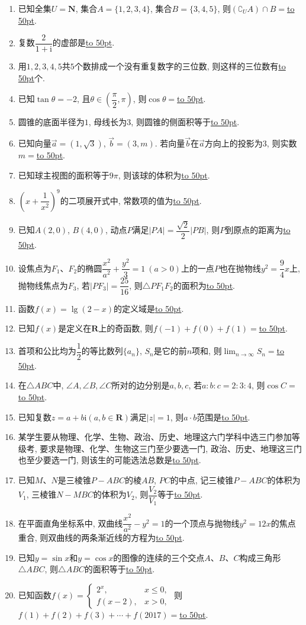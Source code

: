 \documentclass[10pt,a4paper]{article}
\newcommand{\blank}[1]{\underline{\hbox to #1pt{}}}
\begin{document}
\begin{enumerate}[1.]

\item 已知全集$U=\mathbf{N}$, 集合$A=\{1,2,3,4\}$, 集合$B=\{3,4,5\}$, 则$(\complement_U A)\cap B=$\blank{50}.
\item 复数$\dfrac2{1+\mathrm{i}}$的虚部是\blank{50}.
\item 用$1,2,3,4,5$共$5$个数排成一个没有重复数字的三位数, 则这样的三位数有\blank{50}个.
\item 已知$\tan \theta =-2$, 且$\theta \in (\dfrac\pi 2,\pi)$, 则$\cos\theta=$\blank{50}.
\item 圆锥的底面半径为$1$, 母线长为$3$, 则圆锥的侧面积等于\blank{50}.
\item 已知向量$\overrightarrow{a}=(1,\sqrt{3})$, $\overrightarrow{b}=(3,m)$. 若向量$\overrightarrow{b}$在$\overrightarrow{a}$方向上的投影为$3$, 则实数$m=$\blank{50}.
\item 已知球主视图的面积等于$9\pi$, 则该球的体积为\blank{50}.
\item $(x+\dfrac{1}{x^2})^9$的二项展开式中, 常数项的值为\blank{50}.
\item 已知$A(2,0)$, $B(4,0)$, 动点$P$满足$|PA|=\dfrac{\sqrt2} 2|PB|$, 则$P$到原点的距离为\blank{50}.
\item 设焦点为$F_1$、$F_2$的椭圆$\dfrac{x^2}{a^2}+\dfrac{y^2}3=1 \ (a>0)$上的一点$P$也在抛物线$y^2=\dfrac94x$上, 抛物线焦点为$F_3$, 若$|PF_3|=\dfrac{25}{16}$, 则$\triangle PF_1F_2$的面积为\blank{50}.


\item 函数$f(x)=\lg(2-x)$的定义域是\blank{50}.
\item 已知$f(x)$是定义在$\mathbf{R}$上的奇函数, 则$f(-1)+f(0)+f(1)=$\blank{50}.
\item 首项和公比均为$\dfrac12$的等比数列$\{a_n\}$, $S_n$是它的前$n$项和, 则$\displaystyle\lim_{n\to\infty}S_n=$\blank{50}.
\item 在$\triangle ABC$中, $\angle A,\angle B,\angle C$所对的边分别是$a,b,c$, 若$a:b:c=2:3:4 $, 则$\cos C=$\blank{50}.  
\item 已知复数$z=a+b\mathrm{i}(a,b\in \mathbf{R})$满足$|z|=1$, 则$a\cdot b$范围是\blank{50}.  
\item 某学生要从物理、化学、生物、政治、历史、地理这六门学科中选三门参加等级考, 要求是物理、化学、生物这三门至少要选一门, 政治、历史、地理这三门也至少要选一门, 则该生的可能选法总数是\blank{50}.
\item 已知$M$、$N$是三棱锥$P-ABC$的棱$AB$, $PC$的中点, 记三棱锥$P-ABC$的体积为$V_1$, 三棱锥$N-MBC$的体积为$V_2$, 则$\dfrac{V_2}{V_1}$等于\blank{50}.
\item 在平面直角坐标系中, 双曲线$\dfrac{x^2}{a^2}-y^2=1 $的一个顶点与抛物线$y^2=12x$的焦点重合, 则双曲线的两条渐近线的方程为\blank{50}.
\item 已知$y=\sin x$和$y=\cos x$的图像的连续的三个交点$A$、$B$、$C$构成三角形$\triangle ABC$, 则$\triangle ABC$的面积等于\blank{50}.
\item 已知函数$f(x)=\begin{cases} 2^x, & x\le 0, \\ f(x-2), & x>0, \end{cases}$ 则$f(1)+f(2)+f(3)+\cdots+f(2017)=$\blank{50}.


\end{enumerate}
\end{document}
